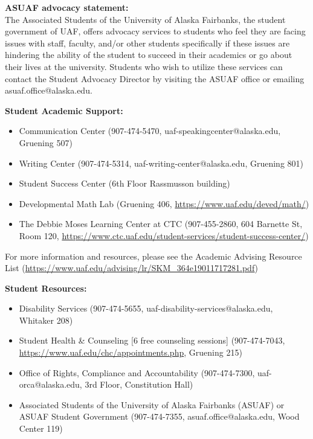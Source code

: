 \documentclass[12pt]{article}
\renewcommand{\emph}[1]{\textsf{\textbf{#1}}}
\newcommand{\localhead}[1]{\par\smallskip\textbf{#1}\nobreak\\}%
\def\subheading#1{\localhead{\emph{#1}}}
\begin{document}
\subheading{ASUAF advocacy statement:} The Associated Students of the University of Alaska Fairbanks, the student government of UAF, offers advocacy services to students who feel they are facing issues with staff, faculty, and/or other students specifically if these issues are hindering the ability of the student to succeed in their academics or go about their lives at the university. Students who wish to utilize these services can contact the Student Advocacy Director by visiting the ASUAF office or emailing asuaf.office@alaska.edu. 

\subheading{Student Academic Support:}
\begin{itemize}
\item Communication Center (907-474-5470, uaf-speakingcenter@alaska.edu, Gruening 507)
\item Writing Center (907-474-5314, uaf-writing-center@alaska.edu, Gruening 801)
\item Student Success Center (6th Floor Rassmusson building)
\item Developmental Math Lab (Gruening 406, \url{https://www.uaf.edu/deved/math/})
\item The Debbie Moses Learning Center at CTC (907-455-2860, 604 Barnette St, Room 120, \url{https://www.ctc.uaf.edu/student-services/student-success-center/})
\end{itemize}
For more information and resources, please see the Academic Advising Resource List (\url{https://www.uaf.edu/advising/lr/SKM_364e19011717281.pdf})

\subheading{Student Resources:}
\begin{itemize}
\item Disability Services (907-474-5655, uaf-disability-services@alaska.edu, Whitaker 208) 
\item Student Health \& Counseling [6 free counseling sessions] (907-474-7043, \url{https://www.uaf.edu/chc/appointments.php}, Gruening 215)
\item Office of Rights, Compliance and Accountability (907-474-7300, uaf-orca@alaska.edu, 3rd Floor, Constitution Hall)
\item Associated Students of the University of Alaska Fairbanks (ASUAF) or ASUAF Student Government (907-474-7355, asuaf.office@alaska.edu, Wood Center 119)
\end{itemize}
\end{document}
